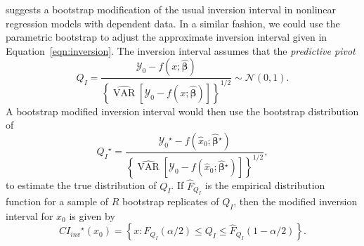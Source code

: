 \documentclass{article}\usepackage[]{graphicx}\usepackage[]{color}
\newcommand{\boot}{\ensuremath{^\star}}
\newcommand{\VAR}{\operatorname{VAR}}
\begin{document}
\citet{huet-statistical-2004} suggests a bootstrap modification of the usual inversion interval in nonlinear regression models with dependent data.  In a similar fashion, we could use the parametric bootstrap to adjust the approximate inversion interval given in Equation~\eqref{eqn:inversion}.  The inversion interval assumes that the \emph{predictive pivot}
\[
  Q_I = \frac{\mathcal{Y}_0-f\left(x; \widehat{\bm{\beta}}\right)}{\left\{ \widehat{\VAR}\left[\mathcal{Y}_0 - f\left(x; \widehat{\bm{\beta}}\right)\right] \right\}^{1/2}} \sim \mathcal{N}(0, 1).
\]
A bootstrap modified inversion interval would then use the bootstrap distribution of
\[
  Q_I\boot = \frac{\mathcal{Y}_0\boot-f\left(\widehat{x}_0; \widehat{\bm{\beta}}\boot\right)}{\left\{ \widehat{\VAR}\left[\mathcal{Y}_0 - f\left(\widehat{x}_0; \widehat{\bm{\beta}}\boot\right)\right] \right\}^{1/2}},
\]
to estimate the true distribution of $Q_I$.  If $\widehat{F}_{Q_I}$ is the empirical distribution function for a sample of $R$ bootstrap replicates of $Q_I$, then the modified inversion interval for $x_0$ is given by
\[
    CI_{inv}\boot\left(x_0\right) = \left\{ x: \widehat{F}_{Q_I}\left(\alpha/2\right) \le Q_I \le \widehat{F}_{Q_I}\left(1-\alpha/2\right) \right\}.
\]
\vspace{25pt}
\end{document}
